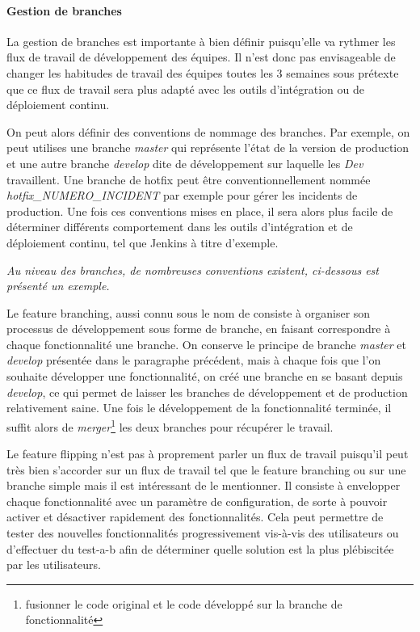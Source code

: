 \paragraph{Gestion de branches}

La gestion de branches est importante à bien définir puisqu'elle va rythmer les flux de travail de développement des équipes. Il n'est donc pas envisageable de changer les habitudes de travail des équipes toutes les 3 semaines sous prétexte que ce flux de travail sera plus adapté avec les outils d'intégration ou de déploiement continu.

On peut alors définir des conventions de nommage des branches. Par exemple, on peut utilises une branche \emph{master} qui représente l'état de la version de production et une autre branche \emph{develop} dite de développement sur laquelle les \emph{Dev} travaillent. Une branche de \gls{hotfix} peut être conventionnellement nommée \emph{hotfix\_NUMERO\_INCIDENT} par exemple pour gérer les incidents de production. Une fois ces conventions mises en place, il sera alors plus facile de déterminer différents comportement dans les outils d'intégration et de déploiement continu, tel que Jenkins à titre d'exemple.

\emph{Au niveau des branches, de nombreuses conventions existent, ci-dessous est présenté un exemple.}

Le feature branching, aussi connu sous le nom de  consiste à organiser son processus de développement sous forme de branche, en faisant correspondre à chaque fonctionnalité une branche. On conserve le principe de branche \emph{master} et \emph{develop} présentée dans le paragraphe précédent, mais à chaque fois que l'on souhaite développer une fonctionnalité, on créé une branche en se basant depuis \emph{develop}, ce qui permet de laisser les branches de développement et de production relativement saine. Une fois le développement de la fonctionnalité terminée, il suffit alors de \emph{merger}\footnote{fusionner le code original et le code développé sur la branche de fonctionnalité} les deux branches pour récupérer le travail.


Le feature flipping n'est pas à proprement parler un flux de travail puisqu'il peut très bien s'accorder sur un flux de travail tel que le feature branching ou sur une branche simple mais il est intéressant de le mentionner. Il consiste à envelopper chaque fonctionnalité avec un paramètre de configuration, de sorte à pouvoir activer et désactiver rapidement des fonctionnalités. Cela peut permettre de tester des nouvelles fonctionnalités progressivement vis-à-vis des utilisateurs ou d'effectuer du \gls{test-a-b} afin de déterminer quelle solution est la plus plébiscitée par les utilisateurs. 

